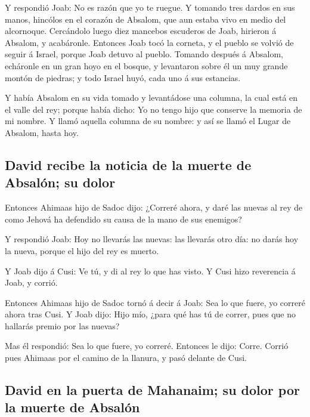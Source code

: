  Y respondió Joab: No es razón que yo te ruegue. Y tomando
tres dardos en sus manos, hincólos en el corazón de Absalom, que aun
estaba vivo en medio del alcornoque.  Cercándolo luego diez
mancebos escuderos de Joab, hirieron á Absalom, y acabáronle.
 Entonces Joab tocó la corneta, y el pueblo se volvió de
seguir á Israel, porque Joab detuvo al pueblo.  Tomando
después á Absalom, echáronle en un gran hoyo en el bosque, y levantaron
sobre él un muy grande montón de piedras; y todo Israel huyó, cada uno á
sus estancias.

 Y había Absalom en su vida tomado y levantádose una
columna, la cual está en el valle del rey; porque había dicho: Yo no
tengo hijo que conserve la memoria de mi nombre. Y llamó aquella columna
de su nombre: y así se llamó el Lugar de Absalom, hasta hoy.

\hypertarget{david-recibe-la-noticia-de-la-muerte-de-absaluxf3n-su-dolor}{%
\subsection{David recibe la noticia de la muerte de Absalón; su
dolor}\label{david-recibe-la-noticia-de-la-muerte-de-absaluxf3n-su-dolor}}

 Entonces Ahimaas hijo de Sadoc dijo: ¿Correré ahora, y
daré las nuevas al rey de como Jehová ha defendido su causa de la mano
de sus enemigos?

 Y respondió Joab: Hoy no llevarás las nuevas: las llevarás
otro día: no darás hoy la nueva, porque el hijo del rey es muerto.

 Y Joab dijo á Cusi: Ve tú, y di al rey lo que has visto. Y
Cusi hizo reverencia á Joab, y corrió.

 Entonces Ahimaas hijo de Sadoc tornó á decir á Joab: Sea
lo que fuere, yo correré ahora tras Cusi. Y Joab dijo: Hijo mío, ¿para
qué has tú de correr, pues que no hallarás premio por las nuevas?

 Mas él respondió: Sea lo que fuere, yo correré. Entonces
le dijo: Corre. Corrió pues Ahimaas por el camino de la llanura, y pasó
delante de Cusi.

\hypertarget{david-en-la-puerta-de-mahanaim-su-dolor-por-la-muerte-de-absaluxf3n}{%
\subsection{David en la puerta de Mahanaim; su dolor por la muerte de
Absalón}\label{david-en-la-puerta-de-mahanaim-su-dolor-por-la-muerte-de-absaluxf3n}}


